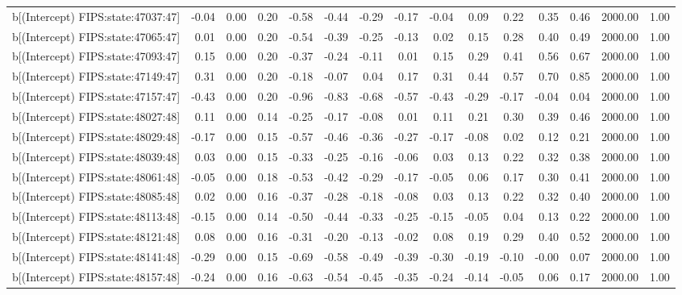 \begin{table}[ht]
\begin{tabular}{rrrrrrrrrrrrrrr}
  b[(Intercept) FIPS:state:47037:47] & -0.04 & 0.00 & 0.20 & -0.58 & -0.44 & -0.29 & -0.17 & -0.04 & 0.09 & 0.22 & 0.35 & 0.46 & 2000.00 & 1.00 \\ 
  b[(Intercept) FIPS:state:47065:47] & 0.01 & 0.00 & 0.20 & -0.54 & -0.39 & -0.25 & -0.13 & 0.02 & 0.15 & 0.28 & 0.40 & 0.49 & 2000.00 & 1.00 \\ 
  b[(Intercept) FIPS:state:47093:47] & 0.15 & 0.00 & 0.20 & -0.37 & -0.24 & -0.11 & 0.01 & 0.15 & 0.29 & 0.41 & 0.56 & 0.67 & 2000.00 & 1.00 \\ 
  b[(Intercept) FIPS:state:47149:47] & 0.31 & 0.00 & 0.20 & -0.18 & -0.07 & 0.04 & 0.17 & 0.31 & 0.44 & 0.57 & 0.70 & 0.85 & 2000.00 & 1.00 \\ 
  b[(Intercept) FIPS:state:47157:47] & -0.43 & 0.00 & 0.20 & -0.96 & -0.83 & -0.68 & -0.57 & -0.43 & -0.29 & -0.17 & -0.04 & 0.04 & 2000.00 & 1.00 \\ 
  b[(Intercept) FIPS:state:48027:48] & 0.11 & 0.00 & 0.14 & -0.25 & -0.17 & -0.08 & 0.01 & 0.11 & 0.21 & 0.30 & 0.39 & 0.46 & 2000.00 & 1.00 \\ 
  b[(Intercept) FIPS:state:48029:48] & -0.17 & 0.00 & 0.15 & -0.57 & -0.46 & -0.36 & -0.27 & -0.17 & -0.08 & 0.02 & 0.12 & 0.21 & 2000.00 & 1.00 \\ 
  b[(Intercept) FIPS:state:48039:48] & 0.03 & 0.00 & 0.15 & -0.33 & -0.25 & -0.16 & -0.06 & 0.03 & 0.13 & 0.22 & 0.32 & 0.38 & 2000.00 & 1.00 \\ 
  b[(Intercept) FIPS:state:48061:48] & -0.05 & 0.00 & 0.18 & -0.53 & -0.42 & -0.29 & -0.17 & -0.05 & 0.06 & 0.17 & 0.30 & 0.41 & 2000.00 & 1.00 \\ 
  b[(Intercept) FIPS:state:48085:48] & 0.02 & 0.00 & 0.16 & -0.37 & -0.28 & -0.18 & -0.08 & 0.03 & 0.13 & 0.22 & 0.32 & 0.40 & 2000.00 & 1.00 \\ 
  b[(Intercept) FIPS:state:48113:48] & -0.15 & 0.00 & 0.14 & -0.50 & -0.44 & -0.33 & -0.25 & -0.15 & -0.05 & 0.04 & 0.13 & 0.22 & 2000.00 & 1.00 \\ 
  b[(Intercept) FIPS:state:48121:48] & 0.08 & 0.00 & 0.16 & -0.31 & -0.20 & -0.13 & -0.02 & 0.08 & 0.19 & 0.29 & 0.40 & 0.52 & 2000.00 & 1.00 \\ 
  b[(Intercept) FIPS:state:48141:48] & -0.29 & 0.00 & 0.15 & -0.69 & -0.58 & -0.49 & -0.39 & -0.30 & -0.19 & -0.10 & -0.00 & 0.07 & 2000.00 & 1.00 \\ 
  b[(Intercept) FIPS:state:48157:48] & -0.24 & 0.00 & 0.16 & -0.63 & -0.54 & -0.45 & -0.35 & -0.24 & -0.14 & -0.05 & 0.06 & 0.17 & 2000.00 & 1.00 \\ 

\end{tabular}
\end{table}
